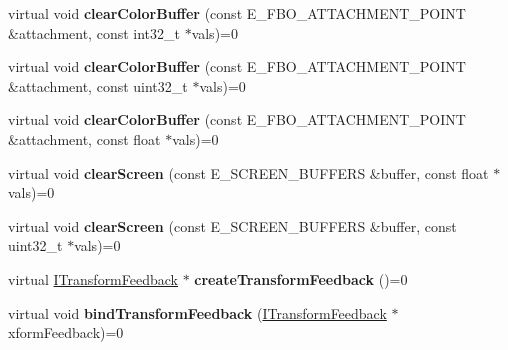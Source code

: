 \begin{DoxyCompactItemize}
\item 
virtual void {\bfseries clear\+Color\+Buffer} (const E\+\_\+\+F\+B\+O\+\_\+\+A\+T\+T\+A\+C\+H\+M\+E\+N\+T\+\_\+\+P\+O\+I\+NT \&attachment, const int32\+\_\+t $\ast$vals)=0\hypertarget{classirr_1_1video_1_1IVideoDriver_aeabb7de919c37d53dfed05ad4c62ff9e}{}\label{classirr_1_1video_1_1IVideoDriver_aeabb7de919c37d53dfed05ad4c62ff9e}

\item 
virtual void {\bfseries clear\+Color\+Buffer} (const E\+\_\+\+F\+B\+O\+\_\+\+A\+T\+T\+A\+C\+H\+M\+E\+N\+T\+\_\+\+P\+O\+I\+NT \&attachment, const uint32\+\_\+t $\ast$vals)=0\hypertarget{classirr_1_1video_1_1IVideoDriver_a2fd4e332386938874a56e787fb7d7eeb}{}\label{classirr_1_1video_1_1IVideoDriver_a2fd4e332386938874a56e787fb7d7eeb}

\item 
virtual void {\bfseries clear\+Color\+Buffer} (const E\+\_\+\+F\+B\+O\+\_\+\+A\+T\+T\+A\+C\+H\+M\+E\+N\+T\+\_\+\+P\+O\+I\+NT \&attachment, const float $\ast$vals)=0\hypertarget{classirr_1_1video_1_1IVideoDriver_a89e94068508574cc1327a9c634022c57}{}\label{classirr_1_1video_1_1IVideoDriver_a89e94068508574cc1327a9c634022c57}

\item 
virtual void {\bfseries clear\+Screen} (const E\+\_\+\+S\+C\+R\+E\+E\+N\+\_\+\+B\+U\+F\+F\+E\+RS \&buffer, const float $\ast$vals)=0\hypertarget{classirr_1_1video_1_1IVideoDriver_a046d35598e7bf1e540cbb0ae91c73d02}{}\label{classirr_1_1video_1_1IVideoDriver_a046d35598e7bf1e540cbb0ae91c73d02}

\item 
virtual void {\bfseries clear\+Screen} (const E\+\_\+\+S\+C\+R\+E\+E\+N\+\_\+\+B\+U\+F\+F\+E\+RS \&buffer, const uint32\+\_\+t $\ast$vals)=0\hypertarget{classirr_1_1video_1_1IVideoDriver_a0a549d901e085c6f9ab0819cce03314b}{}\label{classirr_1_1video_1_1IVideoDriver_a0a549d901e085c6f9ab0819cce03314b}

\item 
virtual \hyperlink{classirr_1_1video_1_1ITransformFeedback}{I\+Transform\+Feedback} $\ast$ {\bfseries create\+Transform\+Feedback} ()=0\hypertarget{classirr_1_1video_1_1IVideoDriver_a35d53be79765ac777e5b2bf8a9661c51}{}\label{classirr_1_1video_1_1IVideoDriver_a35d53be79765ac777e5b2bf8a9661c51}

\item 
virtual void {\bfseries bind\+Transform\+Feedback} (\hyperlink{classirr_1_1video_1_1ITransformFeedback}{I\+Transform\+Feedback} $\ast$xform\+Feedback)=0\hypertarget{classirr_1_1video_1_1IVideoDriver_a56cd7dcee97b68dcabfff12ec53f2fd4}{}\label{classirr_1_1video_1_1IVideoDriver_a56cd7dcee97b68dcabfff12ec53f2fd4}


\end{DoxyCompactItemize}
